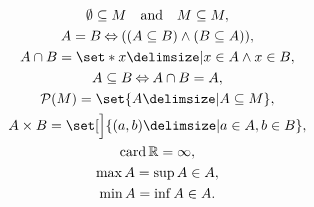 \documentclass[DIV=13]{scrartcl}
\begin{document}
\begin{gather}
  \emptyset\subseteq M \quad\text{and}\quad M\subseteq M, \\
  A=B \lequiv ((A \subseteq B)\land(B \subseteq A)), \\
  A \cap B = \set*{x \given x\in A \land x\in B}, \\
  A \subseteq B \lequiv A \cap B = A, \\
  \mathcal{P}(M) = \set{A \given A\subseteq M}, \\
  A\times B = \set[\Big]{(a,b) \given a\in A, b\in B}, \\
  \card \Rnums = \infty, \\
  \max A = \sup A \in A, \\
  \min A = \inf A \in A.
\end{gather}
\end{document}
